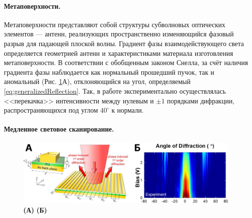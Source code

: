 
\paragraph*{Метаповерхности.}
Метаповерхности представляют собой структуры субволновых оптических элементов --- антенн, реализующих пространственно изменяющийся фазовый разрыв для падающей плоской волны. Градиент фазы взаимодействующего света определяется геометрией антенн и характеристиками материала изготовления метаповерхности. В соответствии с обобщенным законом Снелла, за счёт наличия градиента фазы наблюдается как нормальный прошедший пучок, так и аномальный (Рис. \ref{fig:metasurfaces}А), отклоняющийся на угол, определяемый \eqref{eq:generalizedReflection}. Так, в работе\cite{huang2016gate} экспериментально осуществлялась <<перекачка>> интенсивности между нулевым и $\pm1$ порядками дифракции, распространяющихся под углом $40^\circ$ к нормали\cite{huang2016gate}.

\paragraph*{Медленное световое сканирование.}

\begin{figure}
    \includegraphics[width=\textwidth]{pictures/Metasurfaces.png}
    \caption{\textbf{(А)} \cite[Fig. 1A]{huang2016gate} \textbf{(Б)} \cite[Fig. 4B]{huang2016gate}}
    \label{fig:metasurfaces}
\end{figure}